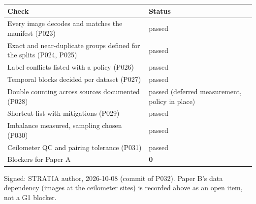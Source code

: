 \begin{center}{\scriptsize\setlength{\tabcolsep}{3pt}
\begin{tabular}{p{9.9cm}p{6.8cm}}
\toprule
Check & Status \\
\midrule
Every image decodes and matches the manifest (P023) & passed \\
Exact and near-duplicate groups defined for the splits (P024, P025) & passed \\
Label conflicts listed with a policy (P026) & passed \\
Temporal blocks decided per dataset (P027) & passed \\
Double counting across sources documented (P028) & passed (deferred measurement, policy in place) \\
Shortcut list with mitigations (P029) & passed \\
Imbalance measured, sampling chosen (P030) & passed \\
Ceilometer QC and pairing tolerance (P031) & passed \\
Blockers for Paper A & \textbf{0} \\
\bottomrule
\end{tabular}}
\end{center}

Signed: STRATIA author, 2026-10-08 (commit of P032). Paper B's data dependency (images at the ceilometer sites) is recorded above as an open item, not a G1 blocker.

